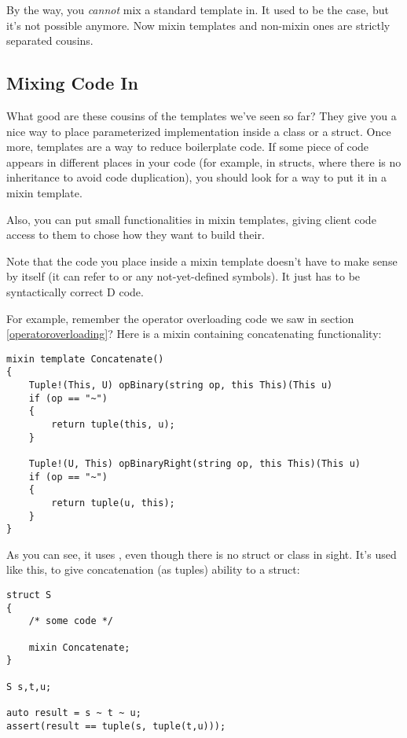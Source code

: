 
By the way, you \emph{cannot} mix a standard template in. It used to be the case, but it's not possible anymore. Now mixin templates and non-mixin ones are strictly separated cousins.

\subsection{Mixing Code In}\label{mixincodein}

What good are these cousins of the templates we've seen so far? They give you a nice way to place parameterized implementation inside a class or a struct. Once more, templates are a way to reduce boilerplate code. If some piece of code appears in different places in your code (for example, in structs, where there is no inheritance to avoid code duplication), you should look for a way to put it in a mixin template.

Also, you can put small functionalities in mixin templates, giving client code access to them to chose how they want to build their.

Note that the code you place inside a mixin template doesn't have to make sense by itself (it can refer to  or any not-yet-defined symbols). It just has to be syntactically correct D code.

For example, remember the operator overloading code we saw in section \ref{operatoroverloading}? Here is a mixin containing concatenating functionality:

\begin{verbatim}
mixin template Concatenate()
{
    Tuple!(This, U) opBinary(string op, this This)(This u) 
    if (op == "~")
    {
        return tuple(this, u);
    }

    Tuple!(U, This) opBinaryRight(string op, this This)(This u) 
    if (op == "~")
    {
        return tuple(u, this);
    }
}
\end{verbatim}

As you can see, it uses , even though there is no struct or class in sight. It's used like this, to give concatenation (as tuples) ability to a struct:

\begin{verbatim}
struct S
{
    /* some code */

    mixin Concatenate;
}

S s,t,u;

auto result = s ~ t ~ u;
assert(result == tuple(s, tuple(t,u)));
\end{verbatim}

